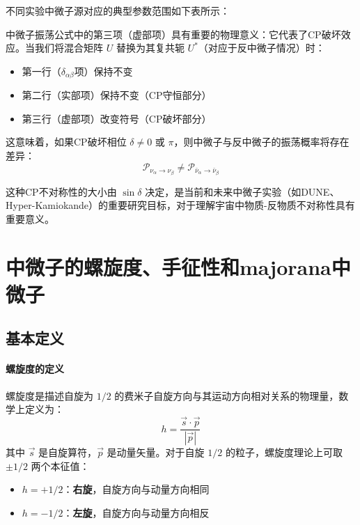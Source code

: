 不同实验中微子源对应的典型参数范围如下表所示：

\begin{derivationnote}[CP破坏与反中微子振荡]
中微子振荡公式中的第三项（虚部项）具有重要的物理意义：它代表了CP破坏效应。当我们将混合矩阵 $U$ 替换为其复共轭 $U^*$（对应于反中微子情况）时：
\begin{itemize}
\item 第一行（$\delta_{\alpha\beta}$项）保持不变
\item 第二行（实部项）保持不变（CP守恒部分）
\item 第三行（虚部项）改变符号（CP破坏部分）
\end{itemize}

这意味着，如果CP破坏相位 $\delta \neq 0$ 或 $\pi$，则中微子与反中微子的振荡概率将存在差异：
\[
\mathcal{P}_{\nu_\alpha \to \nu_\beta} \neq \mathcal{P}_{\bar{\nu}_\alpha \to \bar{\nu}_\beta}
\]

这种CP不对称性的大小由 $\sin\delta$ 决定，是当前和未来中微子实验（如DUNE、Hyper-Kamiokande）的重要研究目标，对于理解宇宙中物质-反物质不对称性具有重要意义。
\end{derivationnote}


\section{中微子的螺旋度、手征性和majorana中微子}

\subsection{基本定义}

\paragraph{螺旋度的定义}
螺旋度是描述自旋为 $1/2$ 的费米子自旋方向与其运动方向相对关系的物理量，数学上定义为：
\begin{equation}\label{eq:helicity_def}
h = \frac{\vec{s} \cdot \vec{p}}{|\vec{p}|}
\end{equation}
其中 $\vec{s}$ 是自旋算符，$\vec{p}$ 是动量矢量。对于自旋 $1/2$ 的粒子，螺旋度理论上可取 $\pm 1/2$ 两个本征值：
\begin{itemize}
\item $h = +1/2$：\textbf{右旋}，自旋方向与动量方向相同
\item $h = -1/2$：\textbf{左旋}，自旋方向与动量方向相反
\end{itemize}

